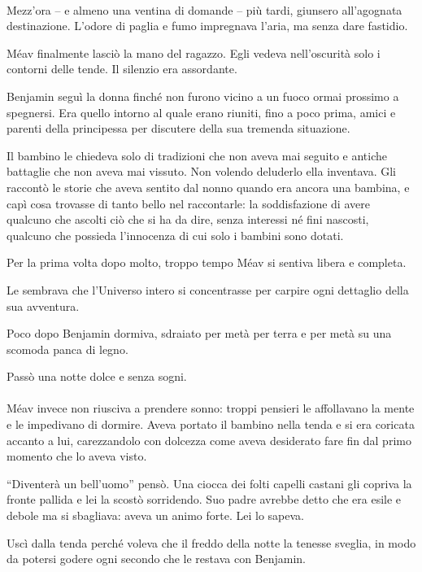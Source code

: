 \documentclass[a4paper,12pt]{book}
\begin{document}
\paragraph{}
Mezz'ora -- e almeno una ventina di domande -- più tardi, giunsero
all'agognata destinazione. L'odore di paglia e fumo impregnava l'aria, ma senza
dare fastidio.

Méav finalmente lasciò la mano del ragazzo. Egli vedeva nell'oscurità solo i
contorni delle tende. Il silenzio era assordante.

Benjamin seguì la donna finché non furono vicino a un fuoco ormai prossimo a
spegnersi. Era quello intorno al quale erano riuniti, fino a poco prima, amici e
parenti della principessa per discutere della sua tremenda situazione.

Il bambino le chiedeva solo di tradizioni che non aveva mai seguito e antiche
battaglie che non aveva mai vissuto. Non volendo deluderlo ella inventava. Gli
raccontò le storie che aveva sentito dal nonno quando era ancora una bambina, e
capì cosa trovasse di tanto bello nel raccontarle: la soddisfazione di avere
qualcuno che ascolti ciò che si ha da dire, senza interessi né fini nascosti,
qualcuno che possieda l'innocenza di cui solo i bambini sono dotati.

Per la prima volta dopo molto, troppo tempo Méav si sentiva libera e completa.

Le sembrava che l'Universo intero si concentrasse per carpire ogni dettaglio
della sua avventura.

Poco dopo Benjamin dormiva, sdraiato per metà per terra e per metà su una
scomoda panca di legno.

Passò una notte dolce e senza sogni.

\paragraph{}
Méav invece non riusciva a prendere sonno: troppi pensieri le affollavano la
mente e le impedivano di dormire. Aveva portato il bambino nella tenda e si era
coricata accanto a lui, carezzandolo con dolcezza come aveva desiderato fare fin
dal primo momento che lo aveva visto.

``Diventerà un bell'uomo'' pensò. Una ciocca dei folti capelli castani gli
copriva la fronte pallida e lei la scostò sorridendo. Suo padre avrebbe detto
che era esile e debole ma si sbagliava: aveva un animo forte. Lei lo sapeva.

Uscì dalla tenda perché voleva che il freddo della notte la tenesse sveglia,
in modo da potersi godere ogni secondo che le restava con Benjamin.
\end{document}

